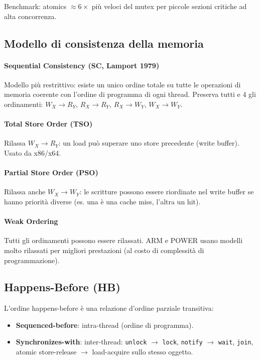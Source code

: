 \documentclass[11pt,a4paper]{article}
\theoremstyle{remark}
\begin{document}
Benchmark: atomics $\approx 6\times$ più veloci del mutex per piccole sezioni critiche ad alta concorrenza.

\subsection{Modello di consistenza della memoria}

\paragraph{Sequential Consistency (SC, Lamport 1979)}
Modello più restrittivo: esiste un unico ordine totale su tutte le operazioni di memoria coerente con l'ordine di programma di ogni thread. Preserva tutti e 4 gli ordinamenti: $W_X \to R_Y$, $R_X \to R_Y$, $R_X \to W_Y$, $W_X \to W_Y$.

\paragraph{Total Store Order (TSO)}
Rilassa $W_X \to R_Y$: un load può superare uno store precedente (write buffer). Usato da x86/x64.

\paragraph{Partial Store Order (PSO)}
Rilassa anche $W_X \to W_Y$: le scritture possono essere riordinate nel write buffer se hanno priorità diverse (es. una è una cache miss, l'altra un hit).

\paragraph{Weak Ordering}
Tutti gli ordinamenti possono essere rilassati. ARM e POWER usano modelli molto rilassati per migliori prestazioni (al costo di complessità di programmazione).

\subsection{Happens-Before (HB)}

L'ordine happens-before è una relazione d'ordine parziale transitiva:
\begin{itemize}
  \item \textbf{Sequenced-before}: intra-thread (ordine di programma).
  \item \textbf{Synchronizes-with}: inter-thread: \texttt{unlock} $\to$ \texttt{lock}, \texttt{notify} $\to$ \texttt{wait}, \texttt{join}, atomic store-release $\to$ load-acquire sullo stesso oggetto.
\end{itemize}
\end{document}
